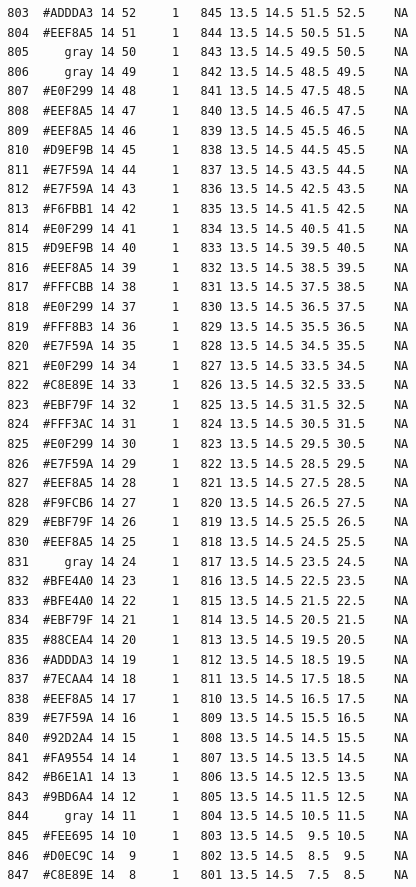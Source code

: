 \documentclass[12pt,twoside]{reedthesis}
\begin{document}
\begin{verbatim}
  803  #ADDDA3 14 52     1   845 13.5 14.5 51.5 52.5    NA
  804  #EEF8A5 14 51     1   844 13.5 14.5 50.5 51.5    NA
  805     gray 14 50     1   843 13.5 14.5 49.5 50.5    NA
  806     gray 14 49     1   842 13.5 14.5 48.5 49.5    NA
  807  #E0F299 14 48     1   841 13.5 14.5 47.5 48.5    NA
  808  #EEF8A5 14 47     1   840 13.5 14.5 46.5 47.5    NA
  809  #EEF8A5 14 46     1   839 13.5 14.5 45.5 46.5    NA
  810  #D9EF9B 14 45     1   838 13.5 14.5 44.5 45.5    NA
  811  #E7F59A 14 44     1   837 13.5 14.5 43.5 44.5    NA
  812  #E7F59A 14 43     1   836 13.5 14.5 42.5 43.5    NA
  813  #F6FBB1 14 42     1   835 13.5 14.5 41.5 42.5    NA
  814  #E0F299 14 41     1   834 13.5 14.5 40.5 41.5    NA
  815  #D9EF9B 14 40     1   833 13.5 14.5 39.5 40.5    NA
  816  #EEF8A5 14 39     1   832 13.5 14.5 38.5 39.5    NA
  817  #FFFCBB 14 38     1   831 13.5 14.5 37.5 38.5    NA
  818  #E0F299 14 37     1   830 13.5 14.5 36.5 37.5    NA
  819  #FFF8B3 14 36     1   829 13.5 14.5 35.5 36.5    NA
  820  #E7F59A 14 35     1   828 13.5 14.5 34.5 35.5    NA
  821  #E0F299 14 34     1   827 13.5 14.5 33.5 34.5    NA
  822  #C8E89E 14 33     1   826 13.5 14.5 32.5 33.5    NA
  823  #EBF79F 14 32     1   825 13.5 14.5 31.5 32.5    NA
  824  #FFF3AC 14 31     1   824 13.5 14.5 30.5 31.5    NA
  825  #E0F299 14 30     1   823 13.5 14.5 29.5 30.5    NA
  826  #E7F59A 14 29     1   822 13.5 14.5 28.5 29.5    NA
  827  #EEF8A5 14 28     1   821 13.5 14.5 27.5 28.5    NA
  828  #F9FCB6 14 27     1   820 13.5 14.5 26.5 27.5    NA
  829  #EBF79F 14 26     1   819 13.5 14.5 25.5 26.5    NA
  830  #EEF8A5 14 25     1   818 13.5 14.5 24.5 25.5    NA
  831     gray 14 24     1   817 13.5 14.5 23.5 24.5    NA
  832  #BFE4A0 14 23     1   816 13.5 14.5 22.5 23.5    NA
  833  #BFE4A0 14 22     1   815 13.5 14.5 21.5 22.5    NA
  834  #EBF79F 14 21     1   814 13.5 14.5 20.5 21.5    NA
  835  #88CEA4 14 20     1   813 13.5 14.5 19.5 20.5    NA
  836  #ADDDA3 14 19     1   812 13.5 14.5 18.5 19.5    NA
  837  #7ECAA4 14 18     1   811 13.5 14.5 17.5 18.5    NA
  838  #EEF8A5 14 17     1   810 13.5 14.5 16.5 17.5    NA
  839  #E7F59A 14 16     1   809 13.5 14.5 15.5 16.5    NA
  840  #92D2A4 14 15     1   808 13.5 14.5 14.5 15.5    NA
  841  #FA9554 14 14     1   807 13.5 14.5 13.5 14.5    NA
  842  #B6E1A1 14 13     1   806 13.5 14.5 12.5 13.5    NA
  843  #9BD6A4 14 12     1   805 13.5 14.5 11.5 12.5    NA
  844     gray 14 11     1   804 13.5 14.5 10.5 11.5    NA
  845  #FEE695 14 10     1   803 13.5 14.5  9.5 10.5    NA
  846  #D0EC9C 14  9     1   802 13.5 14.5  8.5  9.5    NA
  847  #C8E89E 14  8     1   801 13.5 14.5  7.5  8.5    NA

\end{verbatim}
\end{document}
